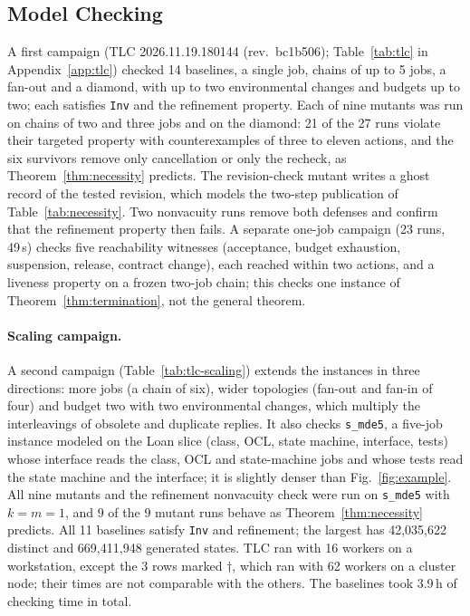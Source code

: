 \documentclass[pdflatex,sn-mathphys-num]{sn-jnl}
\theoremstyle{thmstyleone}%
\theoremstyle{thmstyletwo}%
\theoremstyle{thmstylethree}%
\newcommand{\TLCExtBaselines}{14}
\newcommand{\TLCExtMaxJobs}{5}
\newcommand{\TLCExtMutants}{27}
\newcommand{\TLCExtMutantsCaught}{21}
\newcommand{\TLCExtVersion}{2026.11.19.180144 (rev.\ bc1b506)}
\newcommand{\TLCScaleBaselines}{11}
\newcommand{\TLCScaleMaxStates}{42,035,622}
\newcommand{\TLCScaleMaxGenerated}{669,411,948}
\newcommand{\TLCScaleHours}{3.9}
\newcommand{\TLCScaleHpcRuns}{3}
\newcommand{\TLCScaleMutants}{9}
\newcommand{\TLCScaleMutantsMet}{9}
\newcommand{\TLCScaleWorkers}{16}
\newcommand{\TLCScaleHpcWorkers}{62}
\begin{document}
\subsection{Model Checking}
A first campaign (TLC \TLCExtVersion; Table~\ref{tab:tlc} in Appendix~\ref{app:tlc}) checked \TLCExtBaselines{} baselines, a single job, chains of up to \TLCExtMaxJobs{} jobs, a fan-out and a diamond, with up to two environmental changes and budgets up to two; each satisfies \texttt{Inv} and the refinement property. Each of nine mutants was run on chains of two and three jobs and on the diamond: \TLCExtMutantsCaught{} of the \TLCExtMutants{} runs violate their targeted property with counterexamples of three to eleven actions, and the six survivors remove only cancellation or only the recheck, as Theorem~\ref{thm:necessity} predicts. The revision-check mutant writes a ghost record of the tested revision, which models the two-step publication of Table~\ref{tab:necessity}. Two nonvacuity runs remove both defenses and confirm that the refinement property then fails. A separate one-job campaign (23 runs, 49\,s) checks five reachability witnesses (acceptance, budget exhaustion, suspension, release, contract change), each reached within two actions, and a liveness property on a frozen two-job chain; this checks one instance of Theorem~\ref{thm:termination}, not the general theorem.

\paragraph{Scaling campaign.} A second campaign (Table~\ref{tab:tlc-scaling}) extends the instances in three directions: more jobs (a chain of six), wider topologies (fan-out and fan-in of four) and budget two with two environmental changes, which multiply the interleavings of obsolete and duplicate replies. It also checks \texttt{s\_mde5}, a five-job instance modeled on the Loan slice (class, OCL, state machine, interface, tests) whose interface reads the class, OCL and state-machine jobs and whose tests read the state machine and the interface; it is slightly denser than Fig.~\ref{fig:example}. All nine mutants and the refinement nonvacuity check were run on \texttt{s\_mde5} with $k=m=1$, and \TLCScaleMutantsMet{} of the \TLCScaleMutants{} mutant runs behave as Theorem~\ref{thm:necessity} predicts. All \TLCScaleBaselines{} baselines satisfy \texttt{Inv} and refinement; the largest has \TLCScaleMaxStates{} distinct and \TLCScaleMaxGenerated{} generated states. TLC ran with \TLCScaleWorkers{} workers on a workstation, except the \TLCScaleHpcRuns{} rows marked $\dagger$, which ran with \TLCScaleHpcWorkers{} workers on a cluster node; their times are not comparable with the others. The baselines took \TLCScaleHours\,h of checking time in total.
\end{document}
